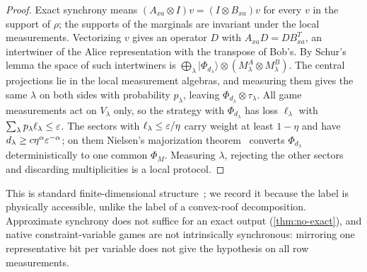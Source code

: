 \begin{proof}
Exact synchrony means $(A_{xa}\otimes I)v=(I\otimes B_{xa})v$ for every $v$ in the support of $\rho$; the supports of the
marginals are invariant under the local measurements. Vectorizing $v$ gives an operator $D$ with
$A_{xa}D=DB_{xa}^T$, an intertwiner of the Alice representation with the transpose of Bob's. By Schur's lemma the space
of such intertwiners is $\bigoplus_\lambda|\Phi_{d_\lambda}\rangle\otimes(M^A_\lambda\otimes M^B_\lambda)$. The central projections lie
in the local measurement algebras, and measuring them gives the same $\lambda$ on both sides with probability $p_\lambda$,
leaving $\Phi_{d_\lambda}\otimes\tau_\lambda$. All game measurements act on $V_\lambda$ only, so the strategy with $\Phi_{d_\lambda}$ has
loss $\ell_\lambda$ with $\sum_\lambda p_\lambda\ell_\lambda\le\varepsilon$. The sectors with $\ell_\lambda\le\varepsilon/\eta$ carry weight at least
$1-\eta$ and have $d_\lambda\ge c\eta^\alpha\varepsilon^{-\alpha}$; on them Nielsen's majorization theorem~\cite{Nie99} converts
$\Phi_{d_\lambda}$ deterministically to one common $\Phi_{M}$. Measuring $\lambda$, rejecting the other sectors and discarding
multiplicities is a local protocol.
\end{proof}

This is standard finite-dimensional structure~\cite{PSSTW16}; we record it because the label is physically accessible,
unlike the label of a convex-roof decomposition. Approximate synchrony does not suffice for an exact output
(\cref{thm:no-exact}), and native constraint-variable games are not intrinsically synchronous: mirroring one
representative bit per variable does not give the hypothesis on all row measurements.


